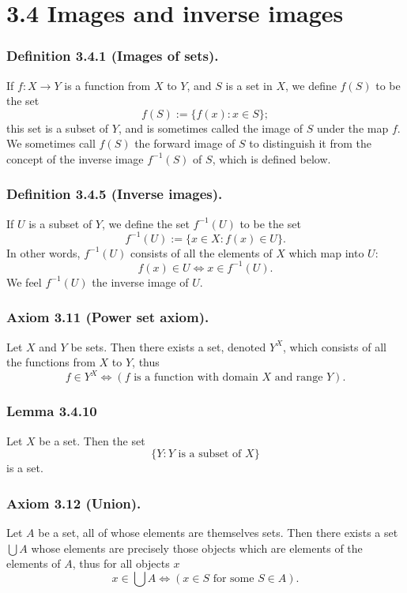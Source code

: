 \documentclass[12pt, letter]{article}
\begin{document}
\section*{3.4 Images and inverse images}
\subsubsection*{Definition 3.4.1 (Images of sets).}
If $f:X\to Y$ is a function from $X$ to $Y$, and $S$ is a set in $X$, we define $f(S)$ to be the set
\begin{equation*}
    f(S):=\{f(x):x\in S\};
\end{equation*}
this set is a subset of $Y$, and is sometimes called the image of $S$ under the map $f$. We sometimes call $f(S)$ the forward image of $S$
to distinguish it from the concept of the inverse image $f^{-1}(S)$ of $S$, which is defined below.

\subsubsection*{Definition 3.4.5 (Inverse images).}
If $U$ is a subset of $Y$, we define the set $f^{-1}(U)$ to be the set 
\begin{equation*}
    f^{-1}(U):=\{x\in X:f(x)\in U\}.
\end{equation*}
In other words, $f^{-1}(U)$ consists of all the elements of $X$ which map into $U$:
\begin{equation*}
    f(x)\in U\iff x\in f^{-1}(U).
\end{equation*}
We feel $f^{-1}(U)$ the inverse image of $U$. 
\subsubsection*{Axiom 3.11 (Power set axiom).}
Let $X$ and $Y$ be sets. Then there exists a set, denoted $Y^X$, which consists of all the functions from $X$ to $Y$, thus
\begin{equation*}
    f\in Y^X\iff (f\text{ is a function with domain }X\text{ and range }Y).
\end{equation*}
\subsubsection*{Lemma 3.4.10}
Let $X$ be a set. Then the set 
\begin{equation*}
    \{Y:Y\text{ is a subset of }X\}
\end{equation*}
is a set.
\subsubsection*{Axiom 3.12 (Union).}
Let $A$ be a set, all of whose elements are themselves sets. Then there exists a set $\bigcup A$ whose elements are precisely those objects
which are elements of the elements of $A$, thus for all objects $x$
\begin{equation*}
    x\in\bigcup A\iff (x\in S\text{ for some }S\in A).
\end{equation*}
\end{document}
